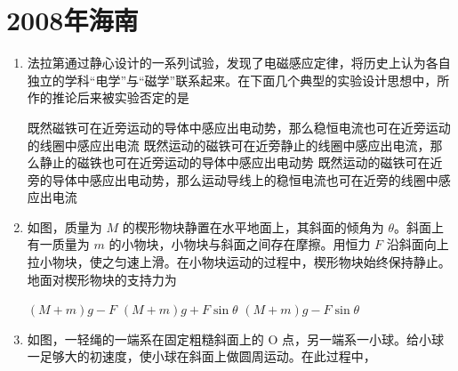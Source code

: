 \documentclass[\gkver]{gaokaozhenti}
\begin{document}
\chapter{2008年海南}

\begin{enumerate}
\item
法拉第通过静心设计的一系列试验，发现了电磁感应定律，将历史上认为各自独立的学科“电学”与“磁学”联系起来。在下面几个典型的实验设计思想中，所作的推论后来被实验否定的是

{既然磁铁可在近旁运动的导体中感应出电动势，那么稳恒电流也可在近旁运动的线圈中感应出电流}
{既然运动的磁铁可在近旁静止的线圈中感应出电流，那么静止的磁铁也可在近旁运动的导体中感应出电动势}
{既然运动的磁铁可在近旁的导体中感应出电动势，那么运动导线上的稳恒电流也可在近旁的线圈中感应出电流}


\item
如图，质量为 $M$ 的楔形物块静置在水平地面上，其斜面的倾角为 $\theta$。斜面上有一质量为 $m$ 的小物块，小物块与斜面之间存在摩擦。用恒力 $F$ 沿斜面向上拉小物块，使之匀速上滑。在小物块运动的过程中，楔形物块始终保持静止。地面对楔形物块的支持力为


{$(M+m)g-F$}
{$(M+m)g+F\sin\theta$}
{$(M+m)g-F\sin\theta$}


\item
如图，一轻绳的一端系在固定粗糙斜面上的 O 点，另一端系一小球。给小球一足够大的初速度，使小球在斜面上做圆周运动。在此过程中，


\end{enumerate}
\end{document}

